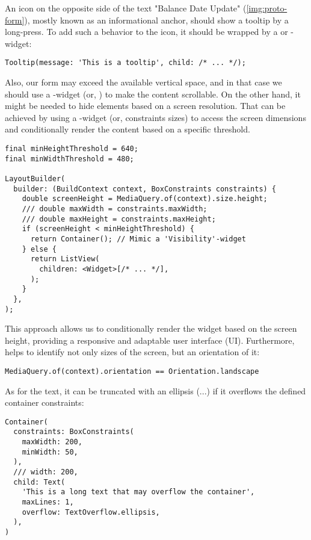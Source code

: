 An icon on the opposite side of the text "Balance Date Update" (\cref{img:proto-form}), mostly known as an informational 
anchor, should show a tooltip by a long-press. To add such a behavior to the icon, it should be wrapped by a  
or -widget:

\begin{lstlisting}
Tooltip(message: 'This is a tooltip', child: /* ... */);
\end{lstlisting}


\noindent Also, our form may exceed the available vertical space, and in that case we should use a
-widget (or, ) to make the content scrollable. On the other hand, 
it might be needed to hide elements based on a screen resolution. That can be achieved by using a -widget 
(or, constraints sizes) to access the screen dimensions and conditionally render the content based on a specific 
threshold.

\begin{lstlisting}
final minHeightThreshold = 640;
final minWidthThreshold = 480;

LayoutBuilder(
  builder: (BuildContext context, BoxConstraints constraints) {
    double screenHeight = MediaQuery.of(context).size.height;
    /// double maxWidth = constraints.maxWidth;
    /// double maxHeight = constraints.maxHeight;
    if (screenHeight < minHeightThreshold) {
      return Container(); // Mimic a 'Visibility'-widget
    } else {
      return ListView(
        children: <Widget>[/* ... */],
      );
    }
  },
);
\end{lstlisting}

\noindent This approach allows us to conditionally render the widget based on the screen height, providing a responsive
and adaptable user interface (UI). Furthermore,  helps to identify not only sizes of the screen, but
an orientation of it:

\begin{lstlisting}
MediaQuery.of(context).orientation == Orientation.landscape
\end{lstlisting}

\noindent As for the text, it can be truncated with an ellipsis (...) if it overflows the defined container 
constraints:

\begin{lstlisting}
Container(
  constraints: BoxConstraints(
    maxWidth: 200,
    minWidth: 50,
  ),
  /// width: 200,
  child: Text(
    'This is a long text that may overflow the container',
    maxLines: 1,
    overflow: TextOverflow.ellipsis,
  ),
)      
\end{lstlisting}
